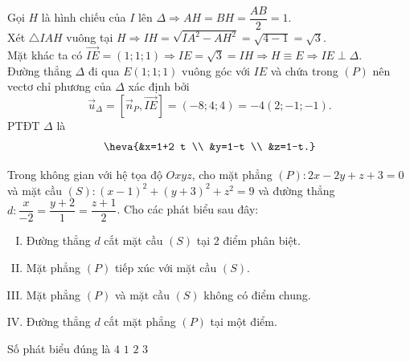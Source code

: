 \begin{ex}
{		Gọi $H$ là hình chiếu của $I$ lên $\Delta \Rightarrow A H=B H=\dfrac{A B}{2}=1$.\\
		Xét $\triangle I A H$ vuông tại $H \Rightarrow I H=\sqrt{I A^2-A H^2}=\sqrt{4-1}=\sqrt{3}$.\\
		Mặt khác ta có $\overrightarrow{I E}=(1; 1; 1) \Rightarrow I E=\sqrt{3}=I H \Rightarrow H \equiv E \Rightarrow I E \perp \Delta$.\\
		Đường thẳng $\Delta$ đi qua $E(1; 1; 1)$ vuông góc với $I E$ và chứa trong $(P)$ nên	vectơ chỉ phương của $\Delta$ xác định bởi $$\overrightarrow{u}_{\Delta}=\left[\overrightarrow{n}_P, \overrightarrow{I E}\right]=(-8; 4; 4)=-4(2;-1;-1).$$
		PTĐT $\Delta$ là $$\heva{&x=1+2 t \\ &y=1-t \\ &z=1-t.}$$	
	}
\end{ex}
\begin{ex}%
	Trong không gian với hệ tọa độ $O x y z$, cho mặt phẳng $(P)\colon 2 x-2 y+z+3=0$ và mặt cầu $(S)\colon(x-1)^2+(y+3)^2+z^2=9$ và đường thẳng $d\colon \dfrac{x}{-2}=\dfrac{y+2}{1}=\dfrac{z+1}{2}$. Cho các phát biểu sau đây:
	\begin{enumerate}[I. ]
		\item Đường thẳng $d$ cắt mặt cầu $(S)$ tại 2 điểm phân biệt.
		\item Mặt phẳng $(P)$ tiếp xúc với mặt cầu $(S)$.
		\item Mặt phẳng $(P)$ và mặt cầu $(S)$ không có điểm chung.
		\item Đường thẳng $d$ cắt mặt phẳng $(P)$ tại một điểm.	
	\end{enumerate}
	Số phát biểu đúng là
	\choice
	{$4$}
	{$1$}
	{$2$}
	{\True $3$}
\end{ex} 

